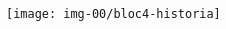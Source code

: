 \documentclass[11pt, a4paper, twoside, pdf]{book}
\begin{document}
\vspace*{\fill}
\begin{center}
	\texttt{[image: img-00/bloc4-historia]}
\end{center}
\vspace*{\fill}



%


\pagestyle{blocfancy}

\newpage 
\immediate\closeout\studentkeys

\def\currentname{Solucionari}
\begin{multicols}{2}
	\fontsize{10.4}{12.4}\selectfont
	
\end{multicols}
\end{document}
